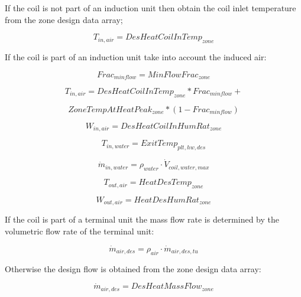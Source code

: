 If the coil is not part of an induction unit then obtain the coil inlet temperature from the zone design data array;

\begin{equation}
T_{in,air} = DesHeatCoilInTemp_{zone}
\end{equation}

If the coil is part of an induction unit take into account the induced air:

\begin{equation}
Frac_{minflow} = MinFlowFrac_{zone}
\end{equation}

\begin{equation}
T_{in,air} = DesHeatCoilInTemp_{zone} * Frac_{minflow} +
\end{equation}

\begin{equation}
ZoneTempAtHeatPeak_{zone} *(1- Frac_{minflow})
\end{equation}

\begin{equation}
W_{in,air} = DesHeatCoilInHumRat_{zone}
\end{equation}

\begin{equation}
T_{in,water} = ExitTemp_{plt,hw,des}
\end{equation}

\begin{equation}
\dot m_{in,water} = \rho_{water} \cdot \dot V_{coil,water,max}
\end{equation}

\begin{equation}
T_{out,air} = HeatDesTemp_{zone}
\end{equation}

\begin{equation}
W_{out,air} = HeatDesHumRat_{zone}
\end{equation}

If the coil is part of a terminal unit the mass flow rate is determined by the volumetric flow rate of the terminal unit:

\begin{equation}
\dot m_{air,des} = \rho_{air} \cdot \dot m_{air,des,tu}
\end{equation}

Otherwise the design flow is obtained from the zone design data array:

\begin{equation}
\dot m_{air,des} = DesHeatMassFlow_{zone}
\end{equation}


